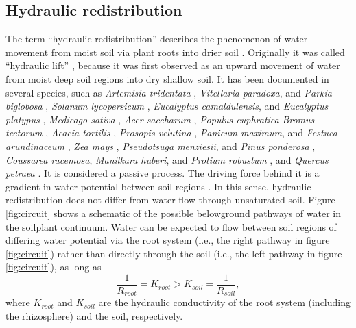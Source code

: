 \subsection{Hydraulic redistribution}

The term ``hydraulic redistribution'' describes the phenomenon of water movement from moist soil via plant roots into drier soil \parencite{burgess_redistribution_1998}.  Originally it was called ``hydraulic lift'' \parencite{richards_hydraulic_1987}, because it was first observed as an upward movement of water from moist deep soil regions into dry shallow soil.  It has been documented in several species, such as
\emph{Artemisia tridentata} \parencite{richards_hydraulic_1987,caldwell_hydraulic_1989},
\emph{Vitellaria paradoxa}, and \emph{Parkia biglobosa} \parencite{bayala_hydraulic_2008},
\emph{Solanum lycopersicum} \parencite{bormann_moisture_1957},
\emph{Eucalyptus camaldulensis}, and \emph{Eucalyptus platypus} \parencite{burgess_tree_2001},
\emph{Medicago sativa} \parencite{corak_water_1987},
\emph{Acer saccharum} \parencite{dawson_hydraulic_1993},
\emph{Populus euphratica} \parencite{hao_hydraulic_2010}
\emph{Bromus tectorum} \parencite{leffler_hydraulic_2005},
\emph{Acacia tortilis} \parencite{ludwig_hydraulic_2003},
\emph{Prosopis velutina} \parencite{scott_ecohydrologic_2008},
\emph{Panicum maximum}, and \emph{Festuca arundinaceum} \parencite{sekiya_applying_2011},
\emph{Zea mays} \parencite{wan_hydraulic_2000},
\emph{Pseudotsuga menziesii}, and \emph{Pinus ponderosa} \parencite{warren_hydraulic_2007},
\emph{Coussarea racemosa}, \emph{Manilkara huberi}, and \emph{Protium robustum} \parencite{Oliveira_2005}, and
\emph{Quercus petraea} \parencite{zapater_evidence_2011}.
It is considered a passive process.  The driving force behind it is a gradient in water potential between soil regions \parencite{scott_ecohydrologic_2008}.  In this sense, hydraulic redistribution does not differ from water flow through unsaturated soil.  Figure \ref{fig:circuit} shows a schematic of the possible belowground pathways of water in the soil\textendash{}plant continuum.  Water can be expected to flow between soil regions of differing water potential via the root system (i.e., the right pathway in figure \ref{fig:circuit}) rather than directly through the soil (i.e., the left pathway in figure \ref{fig:circuit}), as long as
\begin{equation*}
\frac{1}{R_{root}} = K_{root}  >  K_{soil} = \frac{1}{R_{soil}},
\end{equation*}
where $K_{root}$ and $K_{soil}$ are the hydraulic conductivity of the root system (including the rhizosphere) and the soil, respectively.

